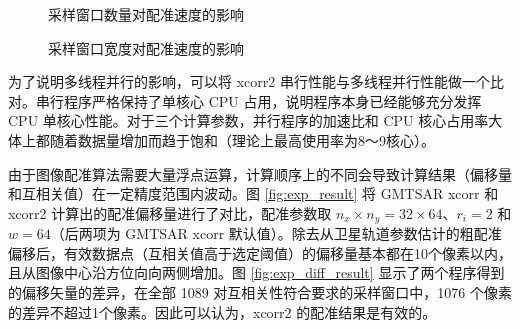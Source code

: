 \begin{figure}[htbp]
\centering
\subfloat[程序计算时间]{
    \label{fig:exp_nxy_a}
    \begin{minipage}[t]{0.49\textwidth}
        \centering
        \resizebox {\textwidth} {!} {
            
        }
    \end{minipage}
}
\caption{采样窗口数量对配准速度的影响} \label{fig:exp_nxy}
\end{figure}

\begin{figure}[htbp]
\centering
\subfloat[程序计算时间]{
    \label{fig:exp_xsys_a}
    \begin{minipage}[t]{0.49\textwidth}
        \centering
        \resizebox {\textwidth} {!} {
            
        }
    \end{minipage}
}
\caption{采样窗口宽度对配准速度的影响} \label{fig:exp_xsys}
\end{figure}

为了说明多线程并行的影响，可以将 xcorr2 串行性能与多线程并行性能做一个比对。串行程序严格保持了单核心 CPU 占用，说明程序本身已经能够充分发挥 CPU 单核心性能。对于三个计算参数，并行程序的加速比和 CPU 核心占用率大体上都随着数据量增加而趋于饱和（理论上最高使用率为8～9核心）。

由于图像配准算法需要大量浮点运算，计算顺序上的不同会导致计算结果（偏移量和互相关值）在一定精度范围内波动。图 \ref{fig:exp_result} 将 GMTSAR xcorr 和 xcorr2 计算出的配准偏移量进行了对比，配准参数取 $n_x\times n_y = 32 \times 64$、$r_i = 2$ 和 $w = 64$（后两项为 GMTSAR xcorr 默认值）。除去从卫星轨道参数估计的粗配准偏移后，有效数据点（互相关值高于选定阈值）的偏移量基本都在10个像素以内，且从图像中心沿方位向向两侧增加。图 \ref{fig:exp_diff_result} 显示了两个程序得到的偏移矢量的差异，在全部 1089 对互相关性符合要求的采样窗口中，1076 个像素的差异不超过1个像素。因此可以认为，xcorr2 的配准结果是有效的。

